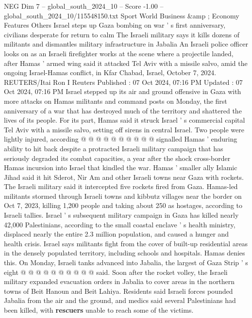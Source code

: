 \begin{textsample}{NEG Dim 7 – global\_south\_2024\_10 – Score -1.00 – global\_south\_2024\_10/115548150.txt}  \label{ex:f7_neg_231}
Sport World Business \&amp ; Economy Features Others Israel steps up Gaza bombing on war ' s first anniversary, civilians desperate for return to calm The Israeli military says it kills dozens of militants and dismantles military infrastructure in Jabalia An Israeli police officer looks on as an Israeli firefighter works at the scene where a projectile landed, after Hamas ' armed wing said it attacked Tel Aviv with a missile salvo, amid the ongoing Israel-Hamas conflict, in Kfar Chabad, Israel, October 7, 2024.
REUTERS/Itai Ron I Reuters Published : 07 Oct 2024, 07:16 PM Updated : 07 Oct 2024, 07:16 PM Israel stepped up its air and ground offensive in Gaza with more attacks on Hamas militants and command posts on Monday, the first anniversary of a war that has destroyed much of the territory and shattered the lives of its people.
For its part, Hamas said it struck Israel ' s commercial capital Tel Aviv with a missile salvo, setting off sirens in central Israel.
Two people were lightly injured, according @ @ @ @ @ @ @ @ @ @ signalled Hamas ' enduring ability to hit back despite a protracted Israeli military campaign that has seriously degraded its combat capacities, a year after the shock cross-border Hamas incursion into Israel that kindled the war.
Hamas ' smaller ally Islamic Jihad said it hit Sderot, Nir Am and other Israeli towns near Gaza with rockets.
The Israeli military said it intercepted five rockets fired from Gaza.
Hamas-led militants stormed through Israeli towns and kibbutz villages near the border on Oct 7, 2023, killing 1,200 people and taking about 250 as hostages, according to Israeli tallies.
Israel ' s subsequent military campaign in Gaza has killed nearly 42,000 Palestinians, according to the small coastal enclave ' s health ministry, displaced nearly the entire 2.3 million population, and caused a hunger and health crisis.
Israel says militants fight from the cover of built-up residential areas in the densely populated territory, including schools and hospitals.
Hamas denies this.
On Monday, Israeli tanks advanced into Jabalia, the largest of Gaza Strip ' s eight @ @ @ @ @ @ @ @ @ @ said.
Soon after the rocket volley, the Israeli military expanded evacuation orders in Jabalia to cover areas in the northern towns of Beit Hanoun and Beit Lahiya.
Residents said Israeli forces pounded Jabalia from the air and the ground, and medics said several Palestinians had been killed, with \textbf{rescuers} unable to reach some of the victims.

\end{textsample}
